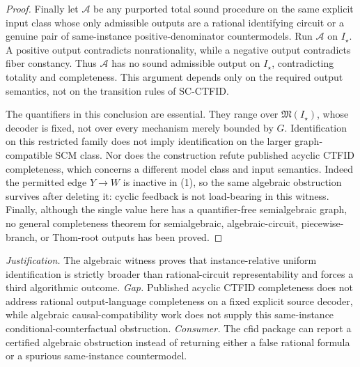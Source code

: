 \documentclass{article}
\begin{document}
\begin{proof}
Finally let \(\mathcal A\) be any purported total sound procedure on the same explicit input class whose only admissible outputs are a rational identifying circuit or a genuine pair of same-instance positive-denominator countermodels.  Run \(\mathcal A\) on \(I_\star\).  A positive output contradicts nonrationality, while a negative output contradicts fiber constancy.  Thus \(\mathcal A\) has no sound admissible output on \(I_\star\), contradicting totality and completeness.  This argument depends only on the required output semantics, not on the transition rules of SC-CTFID.

The quantifiers in this conclusion are essential.  They range over \(\mathfrak M(I_\star)\), whose decoder is fixed, not over every mechanism merely bounded by \(G\).  Identification on this restricted family does not imply identification on the larger graph-compatible SCM class.  Nor does the construction refute published acyclic CTFID completeness, which concerns a different model class and input semantics.  Indeed the permitted edge \(Y\to W\) is inactive in (1), so the same algebraic obstruction survives after deleting it: cyclic feedback is not load-bearing in this witness.  Finally, although the single value here has a quantifier-free semialgebraic graph, no general completeness theorem for semialgebraic, algebraic-circuit, piecewise-branch, or Thom-root outputs has been proved.
\end{proof}
\par\smallskip\noindent \textit{Justification.} The algebraic witness proves that instance-relative uniform identification is strictly broader than rational-circuit representability and forces a third algorithmic outcome. \textit{Gap.} Published acyclic CTFID completeness does not address rational output-language completeness on a fixed explicit source decoder, while algebraic causal-compatibility work does not supply this same-instance conditional-counterfactual obstruction. \textit{Consumer.} The cfid package can report a certified algebraic obstruction instead of returning either a false rational formula or a spurious same-instance countermodel.
\end{document}
